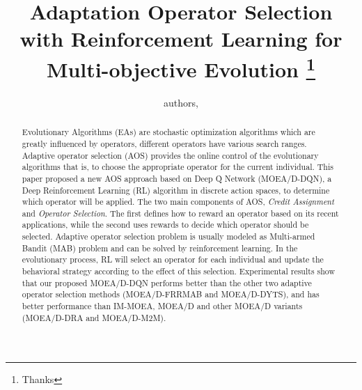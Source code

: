 \documentclass[journal]{IEEEtran}
\begin{document}
\title{{Adaptation Operator Selection with Reinforcement Learning for Multi-objective Evolution}
    \thanks{Thanks}}
\author{
    authors,
}%



\maketitle

\begin{abstract}
    Evolutionary Algorithms (EAs) are stochastic optimization algorithms which are greatly influenced by operators, different operators have various search ranges.
    Adaptive operator selection (AOS) provides the online control of the evolutionary algorithms that is, to choose the appropriate operator for the current individual.
    This paper proposed a new AOS approach based on Deep Q Network (MOEA/D-DQN), a Deep Reinforcement Learning (RL) algorithm in discrete action spaces, to determine which operator will be applied.
    The two main components of AOS, \textit{Credit Assignment} and \textit{Operator Selection}. The first defines how to reward an operator based on its recent applications, while the second uses rewards to decide which operator should be selected.
    Adaptive operator selection problem is usually modeled as Multi-armed Bandit (MAB) problem and can be solved by reinforcement learning.
    In the evolutionary process, RL will select an operator for each individual and update the behavioral strategy according to the effect of this selection.
    Experimental results show that our proposed MOEA/D-DQN performs better than the other two adaptive operator selection methods (MOEA/D-FRRMAB and MOEA/D-DYTS), and has better performance than IM-MOEA, MOEA/D and other MOEA/D variants (MOEA/D-DRA and MOEA/D-M2M).

\end{abstract}
\end{document}
